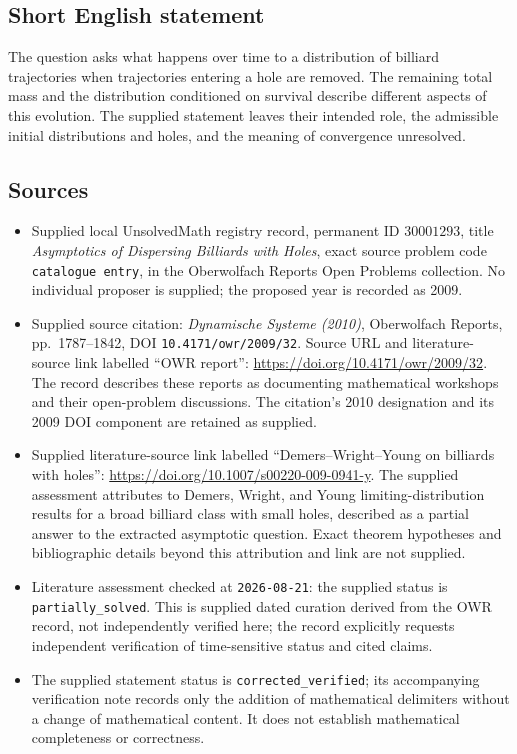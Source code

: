 \documentclass[11pt]{article}
\begin{document}
\subsection{Short English statement}
The question asks what happens over time to a distribution of billiard trajectories when trajectories entering a hole are removed. The remaining total mass and the distribution conditioned on survival describe different aspects of this evolution. The supplied statement leaves their intended role, the admissible initial distributions and holes, and the meaning of convergence unresolved.
\subsection{Sources}
\begin{itemize}
\item Supplied local UnsolvedMath registry record, permanent ID \(30001293\), title \emph{Asymptotics of Dispersing Billiards with Holes}, exact source problem code \texttt{catalogue entry}, in the Oberwolfach Reports Open Problems collection. No individual proposer is supplied; the proposed year is recorded as 2009.
\item Supplied source citation: \emph{Dynamische Systeme (2010)}, Oberwolfach Reports, pp.~1787--1842, DOI \texttt{10.4171/owr/2009/32}. Source URL and literature-source link labelled ``OWR report'': \url{https://doi.org/10.4171/owr/2009/32}. The record describes these reports as documenting mathematical workshops and their open-problem discussions. The citation's 2010 designation and its 2009 DOI component are retained as supplied.
\item Supplied literature-source link labelled ``Demers--Wright--Young on billiards with holes'': \url{https://doi.org/10.1007/s00220-009-0941-y}. The supplied assessment attributes to Demers, Wright, and Young limiting-distribution results for a broad billiard class with small holes, described as a partial answer to the extracted asymptotic question. Exact theorem hypotheses and bibliographic details beyond this attribution and link are not supplied.
\item Literature assessment checked at \texttt{2026-08-21}: the supplied status is \texttt{partially\_solved}. This is supplied dated curation derived from the OWR record, not independently verified here; the record explicitly requests independent verification of time-sensitive status and cited claims.
\item The supplied statement status is \texttt{corrected\_verified}; its accompanying verification note records only the addition of mathematical delimiters without a change of mathematical content. It does not establish mathematical completeness or correctness.
\end{itemize}
\end{document}
